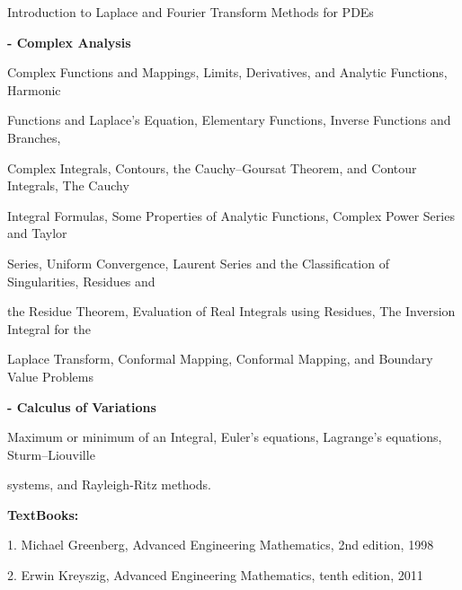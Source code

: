 \documentclass[12pt,a4paper]{article}
\begin{document}
Introduction to Laplace and Fourier Transform Methods for PDEs\par
\vspace{2pt}\textbf{- Complex Analysis}\par
Complex Functions and Mappings, Limits, Derivatives, and Analytic Functions, Harmonic\par
Functions and Laplace’s Equation, Elementary Functions, Inverse Functions and Branches,\par
Complex Integrals, Contours, the Cauchy–Goursat Theorem, and Contour Integrals, The Cauchy\par
Integral Formulas, Some Properties of Analytic Functions, Complex Power Series and Taylor\par
Series, Uniform Convergence, Laurent Series and the Classiﬁcation of Singularities, Residues and\par
the Residue Theorem, Evaluation of Real Integrals using Residues, The Inversion Integral for the\par
Laplace Transform, Conformal Mapping, Conformal Mapping, and Boundary Value Problems\par
\vspace{2pt}\textbf{- Calculus of Variations}\par
Maximum or minimum of an Integral, Euler’s equations, Lagrange’s equations, Sturm–Liouville\par
systems, and Rayleigh-Ritz methods.\par\vspace{4pt}
\textbf{TextBooks:}\par\vspace{2pt}
1. Michael Greenberg, Advanced Engineering Mathematics, 2nd edition, 1998\par
2. Erwin Kreyszig, Advanced Engineering Mathematics, tenth edition, 2011\par
\vspace{4pt}
\end{document}
